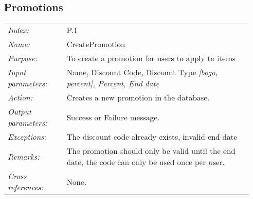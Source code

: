 \documentclass[10pt,letter]{article}
\begin{document}
\subsection{Promotions}

\begin{tabularx}{\textwidth}{l X}
    \it{Index:} & P.1 \\
    \it{Name:} & CreatePromotion \\
    \it{Purpose:} & To create a promotion for users to apply to items \\
    \it{Input parameters:} & Name, Discount Code, Discount Type \it{[bogo, percent]}, Percent, End date\\
    \it{Action:} & Creates a new promotion in the database.\\
    \it{Output parameters:} & Success or Failure message. \\
    \it{Exceptions:} & The discount code already exists, invalid end date \\
    \it{Remarks:} & The promotion should only be valid until the end date, the code can only be used once per user. \\
    \it{Cross references:} & None. \\
    \hline
\end{tabularx}
\end{document}
